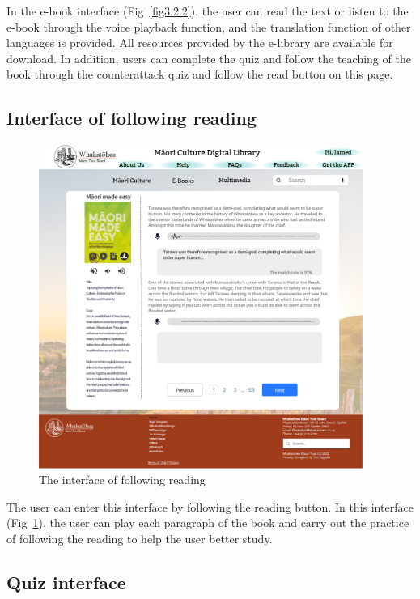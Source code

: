 In the e-book interface (Fig~\ref{fig3.2.2}), the user can read the text or listen to the e-book through the voice playback function, and the translation function of other languages is provided. All resources provided by the e-library are available for download. In addition, users can complete the quiz and follow the teaching of the book through the counterattack quiz and follow the read button on this page.

\subsection{Interface of following reading }

\begin{figure}[htbp]
  \centerline{\includegraphics[width=300pt]{images/3-2-3.png}}
  \caption{The interface of following reading}
  \label{fig3.2.3}
\end{figure}

The user can enter this interface by following the reading button. In this interface (Fig~\ref{fig3.2.3}), the user can play each paragraph of the book and carry out the practice of following the reading to help the user better study.

\subsection{Quiz interface}

